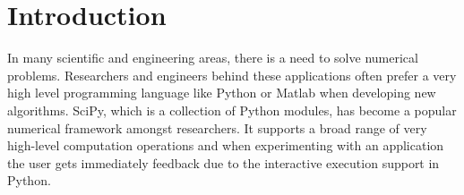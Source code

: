 \documentclass[10pt]{article}
\begin{document}




%
%
%




\section{Introduction}
In many scientific and engineering areas, there is a need to solve numerical problems. Researchers and engineers behind these applications often prefer a very high level programming language like Python\cite{Python} or Matlab when developing new algorithms. SciPy\cite{SciPy}, which is a collection of Python modules, has become a popular numerical framework amongst researchers. It supports a broad range of very high-level computation operations and when experimenting with an application the user gets immediately feedback due to the interactive execution support in Python. 
\end{document}
